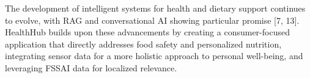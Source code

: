 The development of intelligent systems for health and dietary support continues to evolve, with RAG and conversational AI showing particular promise [7, 13]. HealthHub builds upon these advancements by creating a consumer-focused application that directly addresses food safety and personalized nutrition, integrating sensor data for a more holistic approach to personal well-being, and leveraging FSSAI data for localized relevance.
